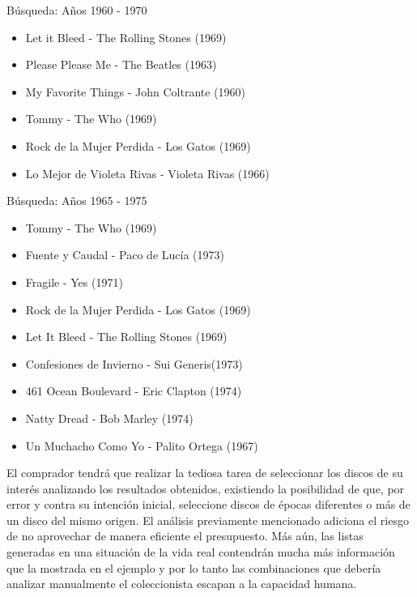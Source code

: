 \begin{mybox}{Búsqueda: Años 1960 - 1970}
\begin{itemize}
	\item {\scriptsize Let it Bleed - The Rolling Stones (1969)}
	\item {\scriptsize Please Please Me - The Beatles (1963)}
	\item {\scriptsize My Favorite Things - John Coltrante (1960)}
	\item {\scriptsize Tommy - The Who (1969)}
	\item {\scriptsize Rock de la Mujer Perdida - Los Gatos (1969)}
	\item {\scriptsize Lo Mejor de Violeta Rivas - Violeta Rivas (1966)}
\end{itemize}
\end{mybox}

\begin{mybox}{Búsqueda: Años 1965 - 1975}
\begin{itemize}
	\item {\scriptsize Tommy - The Who (1969)}
	\item {\scriptsize Fuente y Caudal - Paco de Lucía (1973)}
	\item {\scriptsize Fragile - Yes (1971)}
	\item {\scriptsize Rock de la Mujer Perdida - Los Gatos (1969)}
	\item {\scriptsize Let It Bleed - The Rolling Stones (1969)}
	\item {\scriptsize Confesiones de Invierno - Sui Generis(1973)}
	\item {\scriptsize 461 Ocean Boulevard - Eric Clapton (1974)}
	\item {\scriptsize Natty Dread - Bob Marley (1974)}
	\item {\scriptsize Un Muchacho Como Yo - Palito Ortega (1967)}
\end{itemize}
\end{mybox}

El comprador tendrá que realizar la tediosa tarea de seleccionar los discos de su interés analizando los resultados obtenidos, existiendo la posibilidad de que, por error y contra su intención inicial, seleccione discos de épocas diferentes o más de un disco del mismo origen. El análisis previamente mencionado adiciona el riesgo de no aprovechar de manera eficiente el presupuesto. Más aún, las listas generadas en una situación de la vida real contendrán mucha más información que la mostrada en el ejemplo y por lo tanto las combinaciones que debería analizar manualmente el coleccionista escapan a la capacidad humana. 

